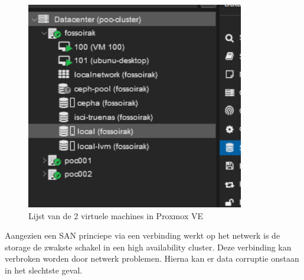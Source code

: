 \begin{figure}[H]
  \centering
  \includegraphics[width=0.85\textwidth]{../poc/vm-lijst-prox.png}
  \caption{Lijst van de 2 virtuele machines in Proxmox VE}
  \label{fig:vm-lijst}
\end{figure}
Aangezien een SAN princiepe via een verbinding werkt op het netwerk is de storage de zwakste schakel in een high availability cluster. Deze verbinding kan verbroken worden door netwerk problemen. Hierna kan er data corruptie onstaan in het slechtste geval.

